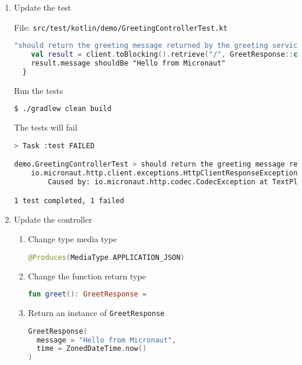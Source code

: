 \begin{enumerate}
\item Update the test

File: \texttt{src/test/kotlin/demo/GreetingControllerTest.kt}
\begin{lstlisting}[language=Kotlin]
  "should return the greeting message returned by the greeting service" {
    val result = client.toBlocking().retrieve("/", GreetResponse::class.java)
    result.message shouldBe "Hello from Micronaut"
  }
\end{lstlisting}

Run the tests

\begin{lstlisting}[language=bash]
$ ./gradlew clean build
\end{lstlisting}

The tests will fail

\begin{lstlisting}[language=bash]
  > Task :test FAILED

demo.GreetingControllerTest > should return the greeting message returned by the greeting service FAILED
    io.micronaut.http.client.exceptions.HttpClientResponseException at DefaultHttpClient.java:2075
        Caused by: io.micronaut.http.codec.CodecException at TextPlainCodec.java:95

1 test completed, 1 failed
\end{lstlisting}

\item Update the controller

\begin{enumerate}

\item Change type media type

\begin{lstlisting}[language=Kotlin]
@Produces(MediaType.APPLICATION_JSON)
\end{lstlisting}

\item Change the function return type

\begin{lstlisting}[language=Kotlin]
fun greet(): GreetResponse =
\end{lstlisting}

\item Return an instance of \texttt{GreetResponse}

\begin{lstlisting}[language=Kotlin]
GreetResponse(
  message = "Hello from Micronaut",
  time = ZonedDateTime.now()
)
\end{lstlisting}


\end{enumerate}
\end{enumerate}
